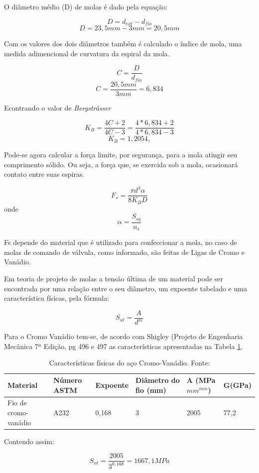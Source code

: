 O diâmetro médio (D) de molas é dado pela equação:

$$D=d_{ext}-d_{fio}$$
$$D=23,5mm-3mm=20,5mm$$

Com os valores dos dois diâmetros também é calculado o índice de mola, uma medida adimencional de curvatura da espiral da mola.

$$C=\frac{D}{d_{fio}}$$
$$C=\frac{20,5mm}{3mm}=6,834$$

Econtrando o valor de \textit{Bergsträsser}

$$K_B=\frac{4C+2}{4C-3}=\frac{4*6,834+2}{4*6,834-3}$$
$$K_B=1,2054,$$

Pode-se agora calcular a força limite, por segurança, para a mola atingir seu comprimento sólido. Ou seja, a força que, se exercida sob a mola, ocasionará contato entre suas espiras.

$$F_s=\frac{\pi d^3 \alpha}{8 K_B D}$$ onde $$\alpha=\frac{S_{sy}}{n_s}$$

Fs depende do material que é utilizado para confeccionar a mola, no caso de molas de comando de válvula, como informado, são feitas de Ligas de Cromo e Vanádio.

Em teoria de projeto de molas a tensão última de um material pode ser encontrada por uma relação entre o seu diâmetro, um expoente tabelado e uma característica físicas, pela fórmula:

$$S_{ut}=\frac{A}{d^m}$$

Para o Cromo Vanádio tem-se, de acordo com Shigley (Projeto de Engenharia Mecânica 7ª Edição, pg 496 e 497 as características apresentadas na Tabela \ref{tab:caracteristicas_cromovanadio}.

\begin{table}[H]
    \begin{tabular}{|p{2cm}|p{2cm}|p{2cm}|p{2cm}|p{2cm}|p{2cm}|}
        \hline
        \textbf{Material} & \textbf{Número ASTM} & \textbf{Expoente} & \textbf{Diâmetro do fio (mm)} & \textbf{A (MPa $mm^{mm}$)} & \textbf{G(GPa)} \\ \hline
        Fio de cromo-vanádio& A232& 0,168& 3&2005 &77,2                                                 \\ \hline
    \end{tabular}
    \caption{Características físicas do aço Cromo-Vanádio. Fonte: \cite{shigley}}
    \label{tab:caracteristicas_cromovanadio}
\end{table}


Contendo assim:

$$S_{ut}=\frac{2005}{3^{0,168}}=1667,1MPa$$

